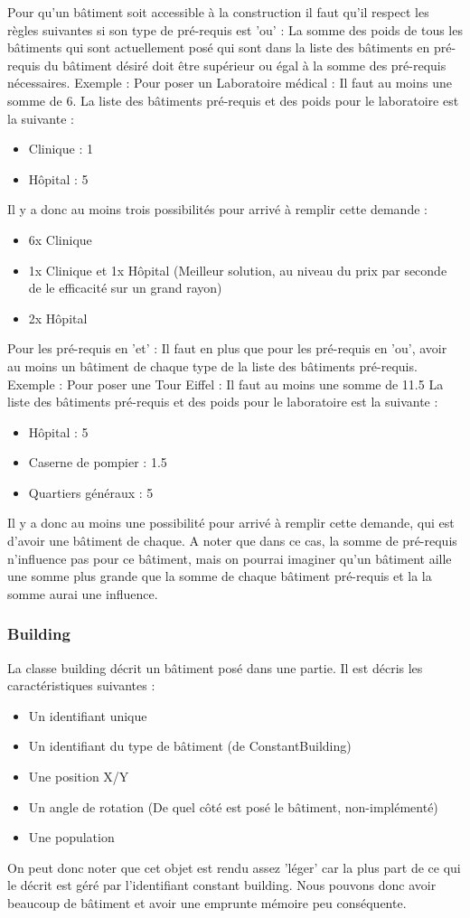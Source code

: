 \documentclass[a4paper,10pt,openany,oneside]{report}
\begin{document}
Pour qu'un bâtiment soit accessible à la construction il faut qu'il respect les règles suivantes si son type de pré-requis est 'ou' :
La somme des poids de tous les bâtiments qui sont actuellement posé qui sont dans la liste des bâtiments en pré-requis du bâtiment désiré doit être supérieur ou égal à la somme des pré-requis nécessaires.
Exemple :
Pour poser un Laboratoire médical : Il faut au moins une somme de 6.
La liste des bâtiments pré-requis et des poids pour le laboratoire est la suivante :
\begin{itemize}
	\item Clinique : 1
	\item Hôpital : 5
\end{itemize}
Il y a donc au moins trois possibilités pour arrivé à remplir cette demande :
\begin{itemize}
	\item 6x Clinique
	\item 1x Clinique et 1x Hôpital (Meilleur solution, au niveau du prix par seconde de le efficacité sur un grand rayon)
	\item 2x Hôpital
\end{itemize}

Pour les pré-requis en 'et' :
Il faut en plus que pour les pré-requis en 'ou', avoir au moins un bâtiment de chaque type de la liste des bâtiments pré-requis.
Exemple :
Pour poser une Tour Eiffel : Il faut au moins une somme de 11.5
La liste des bâtiments pré-requis et des poids pour le laboratoire est la suivante :
\begin{itemize}
	\item Hôpital : 5
	\item Caserne de pompier : 1.5
	\item Quartiers généraux : 5
\end{itemize}
Il y a donc au moins une possibilité pour arrivé à remplir cette demande, qui est d'avoir une bâtiment de chaque. A noter que dans ce cas, la somme de pré-requis n'influence pas pour ce bâtiment, mais on pourrai imaginer qu'un bâtiment aille une somme plus grande que la somme de chaque bâtiment pré-requis et la la somme aurai une influence.

\subsubsection{Building}
La classe building décrit un bâtiment posé dans une partie. Il est décris les caractéristiques suivantes :
\begin{itemize}
	\item Un identifiant unique
	\item Un identifiant du type de bâtiment (de ConstantBuilding)
	\item Une position X/Y
	\item Un angle de rotation (De quel côté est posé le bâtiment, non-implémenté)
	\item Une population
\end{itemize}
On peut donc noter que cet objet est rendu assez 'léger' car la plus part de ce qui le décrit est géré par l'identifiant constant building. Nous pouvons donc avoir beaucoup de bâtiment et avoir une emprunte mémoire peu conséquente.
\end{document}
